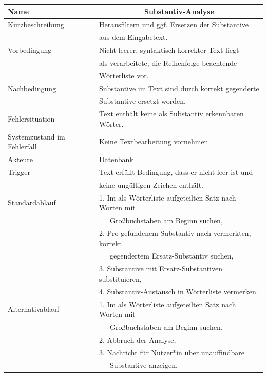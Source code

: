 \documentclass[paper=a4, parskip=half]{scrreprt}
\begin{document}
\begin{table}[htb]
\begin{tabular}{|l|l|}
\hline
Name                        & \multicolumn{1}{c|}{\textbf{Substantiv-Analyse}} \\ \hline
Kurzbeschreibung            & Herausfiltern und ggf. Ersetzen der Substantive \\
                            & aus dem Eingabetext. \\ \hline
Vorbedingung                & Nicht leerer, syntaktisch korrekter Text liegt \\
                            & als verarbeitete, die Reihenfolge beachtende \\
                            & Wörterliste vor. \\ \hline
Nachbedingung               & Substantive im Text sind durch korrekt gegenderte \\
                            & Substantive ersetzt worden. \\ \hline
Fehlersituation             & Text enthält keine als Substantiv erkennbaren Wörter. \\ \hline
Systemzustand im Fehlerfall & Keine Textbearbeitung vornehmen. \\ \hline
Akteure                     & Datenbank \\ \hline
Trigger                     & Text erfüllt Bedingung, dass er nicht leer ist und \\
                            & keine ungültigen Zeichen enthält. \\ \hline
Standardablauf              & 1. Im als Wörterliste aufgeteilten Satz nach Worten mit \\
                            &    Großbuchstaben am Beginn suchen, \\
                            & 2. Pro gefundenem Substantiv nach vermerkten, korrekt \\
                            &    gegendertem Ersatz-Substantiv suchen, \\
                            & 3. Substantive mit Ersatz-Substantiven substituieren, \\
                            & 4. Substantiv-Austausch in Wörterliste vermerken. \\ \hline
Alternativablauf            & 1. Im als Wörterliste aufgeteilten Satz nach Worten mit \\
                            &    Großbuchstaben am Beginn suchen, \\
                            & 2. Abbruch der Analyse, \\
                            & 3. Nachricht für Nutzer*in über unauffindbare \\
                            &    Substantive anzeigen. \\ \hline
\end{tabular}
\end{table}
\end{document}
